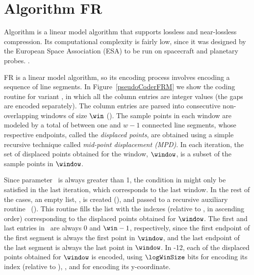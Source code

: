 
\section{Algorithm FR}
\label{algo:fr}


Algorithm \textit{\FRfull} \cite{coder:fr} is a linear model algorithm that supports lossless and near-lossless compression. Its computational complexity is fairly low, since it was designed by the European Space Association (ESA) to be run on spacecraft and planetary probes. \WindowParam {}.

FR is a linear model algorithm, so its encoding process involves encoding a sequence of line segments. In Figure~\ref{pseudoCoderFRM} we show the coding routine for variant \maskalgo, in which all the column entries are integer values (the gaps are encoded separately). The column entries are parsed into consecutive non-overlapping windows of size $\win$ (). The sample points in each window are modeled by a total of between one and $w-1$ connected line segments, whose respective endpoints, called the \textit{displaced points}, are obtained using a simple recursive technique called \textit{mid-point displacement (MPD)}. In each iteration, the set of displaced points obtained for the window, $\window$, is a subset of the sample points in $\window$.


Since parameter \win\ is always greater than 1, the condition in  might only be satisfied in the last iteration, which corresponds to the last window. In the rest of the cases, an empty list, \disPoints, is created (), and passed to a recursive auxiliary routine \getDisplacedPointsMethod\ (). This routine fills the list with the indexes (relative to \window, in ascending order) corresponding to the displaced points obtained for $\window$. The first and last entries in \disPoints\ are always 0 and $\win-1$, respectively, since the first endpoint of the first segment is always the first point in $\window$, and the last endpoint of the last segment is always the last point in $\window$. In -12, each of the displaced points obtained for $\window$ is encoded, using $\logWinSize$ bits for encoding its index (relative to \window), \indexx, and \tobitexp for encoding its y-coordinate.


\clearpage





